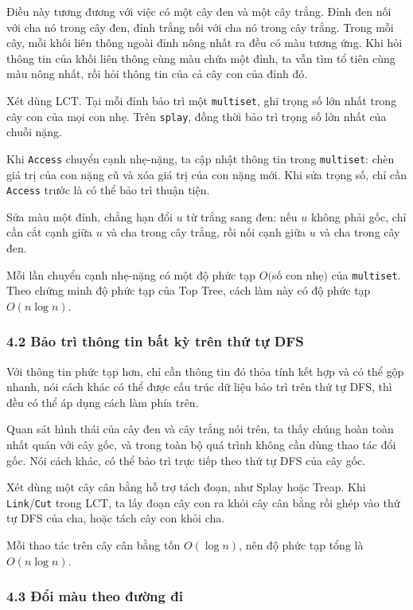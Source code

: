 \documentclass[11pt]{article}
\begin{document}
Điều này tương đương với việc có một cây đen và một cây trắng. Đỉnh đen nối với
cha nó trong cây đen, đỉnh trắng nối với cha nó trong cây trắng. Trong mỗi cây,
mỗi khối liên thông ngoài đỉnh nông nhất ra đều có màu tương ứng. Khi hỏi thông
tin của khối liên thông cùng màu chứa một đỉnh, ta vẫn tìm tổ tiên cùng màu nông
nhất, rồi hỏi thông tin của cả cây con của đỉnh đó.

Xét dùng LCT. Tại mỗi đỉnh bảo trì một \texttt{multiset}, ghi trọng số lớn nhất
trong cây con của mọi con nhẹ. Trên \texttt{splay}, đồng thời bảo trì trọng số
lớn nhất của chuỗi nặng.

Khi \texttt{Access} chuyển cạnh nhẹ-nặng, ta cập nhật thông tin trong
\texttt{multiset}: chèn giá trị của con nặng cũ và xóa giá trị của con nặng mới.
Khi sửa trọng số, chỉ cần \texttt{Access} trước là có thể bảo trì thuận tiện.

Sửa màu một đỉnh, chẳng hạn đổi \(u\) từ trắng sang đen: nếu \(u\) không phải
gốc, chỉ cần cắt cạnh giữa \(u\) và cha trong cây trắng, rồi nối cạnh giữa \(u\)
và cha trong cây đen.

Mỗi lần chuyển cạnh nhẹ-nặng có một độ phức tạp \(O(\)số con nhẹ\()\) của
\texttt{multiset}. Theo chứng minh độ phức tạp của Top Tree, cách làm này có độ
phức tạp \(O(n\log n)\).

\subsubsection*{4.2 Bảo trì thông tin bất kỳ trên thứ tự DFS}

Với thông tin phức tạp hơn, chỉ cần thông tin đó thỏa tính kết hợp và có thể gộp
nhanh, nói cách khác có thể được cấu trúc dữ liệu bảo trì trên thứ tự DFS, thì
đều có thể áp dụng cách làm phía trên.

Quan sát hình thái của cây đen và cây trắng nói trên, ta thấy chúng hoàn toàn
nhất quán với cây gốc, và trong toàn bộ quá trình không cần dùng thao tác đổi
gốc. Nói cách khác, có thể bảo trì trực tiếp theo thứ tự DFS của cây gốc.

Xét dùng một cây cân bằng hỗ trợ tách đoạn, như Splay hoặc Treap. Khi
\texttt{Link}/\texttt{Cut} trong LCT, ta lấy đoạn cây con ra khỏi cây cân bằng
rồi ghép vào thứ tự DFS của cha, hoặc tách cây con khỏi cha.

Mỗi thao tác trên cây cân bằng tốn \(O(\log n)\), nên độ phức tạp tổng là
\(O(n\log n)\).

\subsubsection*{4.3 Đổi màu theo đường đi}
\end{document}
